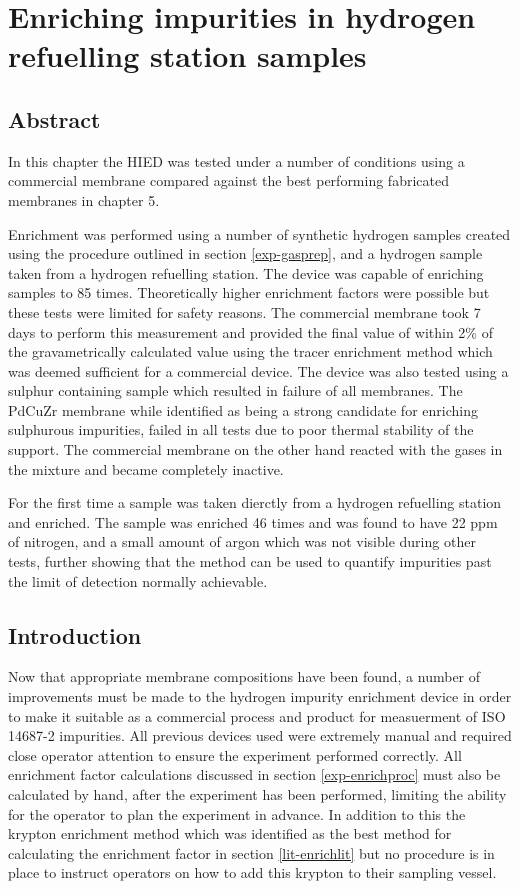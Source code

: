 \chapter{Enriching impurities in hydrogen refuelling station samples}

\section*{Abstract}
In this chapter the HIED  was tested under a number of conditions using a commercial membrane compared against the best performing fabricated membranes in chapter 5. 

Enrichment was performed using a number of synthetic hydrogen samples created using the procedure outlined in section \ref{exp-gasprep}, and a hydrogen sample taken from a hydrogen refuelling station. The device was capable of enriching samples to 85 times. Theoretically higher enrichment factors were possible but these tests were limited for safety reasons. The commercial membrane took 7 days to perform this measurement and provided the final value of within 2\% of the gravametrically calculated value using the tracer enrichment method which was deemed sufficient for a commercial device. The device was also tested using a sulphur containing sample which resulted in failure of all membranes. The PdCuZr membrane while identified as being a strong candidate for enriching sulphurous impurities, failed in all tests due to poor thermal stability of the support. The commercial membrane on the other hand reacted with the gases in the mixture and became completely inactive. 

For the first time a sample was taken dierctly from a hydrogen refuelling station and enriched. The sample was enriched 46 times and was found to have 22 ppm of nitrogen, and a small amount of argon which was not visible during other tests, further showing that the method can be used to quantify impurities past the limit of detection normally achievable.   

\section{Introduction}
Now that appropriate membrane compositions have been found, a number of improvements must be made to the hydrogen impurity enrichment device in order to make it suitable as a commercial process and product for measuerment of ISO 14687-2 impurities. All previous devices used were extremely manual and required close operator attention to ensure the experiment performed correctly. All enrichment factor calculations discussed in section \ref{exp-enrichproc} must also be calculated by hand, after the experiment has been performed, limiting the ability for the operator to plan the experiment in advance. In addition to this the krypton enrichment method which was identified as the best method for calculating the enrichment factor in section \ref{lit-enrichlit} but no procedure is in place to instruct operators on how to add this krypton to their sampling vessel. 

